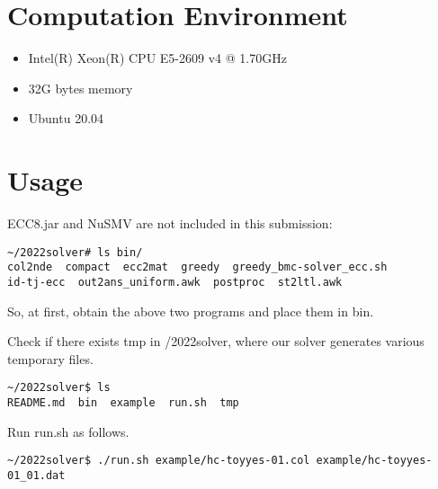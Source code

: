 \documentclass{article}
\begin{document}
\section{Computation Environment}
\begin{itemize}
\item Intel(R) Xeon(R) CPU E5-2609 v4 @ 1.70GHz
\item 32G bytes memory
\item Ubuntu 20.04
\end{itemize}

\section{Usage}
ECC8.jar and NuSMV are not included in this submission:
\begin{verbatim}
~/2022solver# ls bin/
col2nde  compact  ecc2mat  greedy  greedy_bmc-solver_ecc.sh  
id-tj-ecc  out2ans_uniform.awk  postproc  st2ltl.awk
\end{verbatim}
So, at first, obtain the above two programs and place them in bin.

Check if there exists tmp in /2022solver, where our solver generates various temporary files.
\begin{verbatim}
~/2022solver$ ls
README.md  bin  example  run.sh  tmp
\end{verbatim}

Run run.sh as follows.
\begin{verbatim}
~/2022solver$ ./run.sh example/hc-toyyes-01.col example/hc-toyyes-01_01.dat
\end{verbatim}



\end{document}
